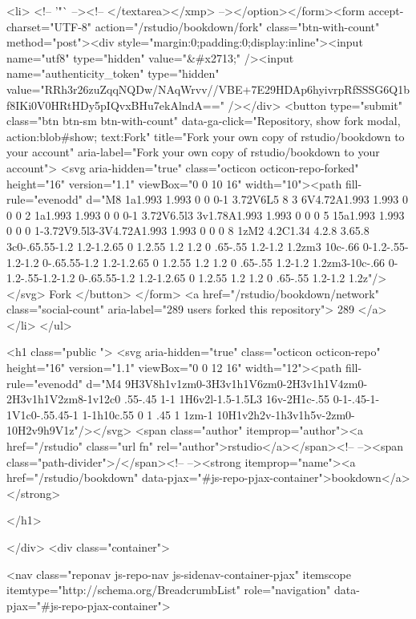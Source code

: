   <li>
          <!-- '"` --><!-- </textarea></xmp> --></option></form><form accept-charset="UTF-8" action="/rstudio/bookdown/fork" class="btn-with-count" method="post"><div style="margin:0;padding:0;display:inline"><input name="utf8" type="hidden" value="&#x2713;" /><input name="authenticity_token" type="hidden" value="RRh3r26zuZqqNQDw/NAqWrvv//VBE+7E29HDAp6hyivrpRfSSSG6Q1bf8IKi0V0HRtHDy5pIQvxBHu7ekAlndA==" /></div>
            <button
                type="submit"
                class="btn btn-sm btn-with-count"
                data-ga-click="Repository, show fork modal, action:blob#show; text:Fork"
                title="Fork your own copy of rstudio/bookdown to your account"
                aria-label="Fork your own copy of rstudio/bookdown to your account">
              <svg aria-hidden="true" class="octicon octicon-repo-forked" height="16" version="1.1" viewBox="0 0 10 16" width="10"><path fill-rule="evenodd" d="M8 1a1.993 1.993 0 0 0-1 3.72V6L5 8 3 6V4.72A1.993 1.993 0 0 0 2 1a1.993 1.993 0 0 0-1 3.72V6.5l3 3v1.78A1.993 1.993 0 0 0 5 15a1.993 1.993 0 0 0 1-3.72V9.5l3-3V4.72A1.993 1.993 0 0 0 8 1zM2 4.2C1.34 4.2.8 3.65.8 3c0-.65.55-1.2 1.2-1.2.65 0 1.2.55 1.2 1.2 0 .65-.55 1.2-1.2 1.2zm3 10c-.66 0-1.2-.55-1.2-1.2 0-.65.55-1.2 1.2-1.2.65 0 1.2.55 1.2 1.2 0 .65-.55 1.2-1.2 1.2zm3-10c-.66 0-1.2-.55-1.2-1.2 0-.65.55-1.2 1.2-1.2.65 0 1.2.55 1.2 1.2 0 .65-.55 1.2-1.2 1.2z"/></svg>
              Fork
            </button>
</form>
    <a href="/rstudio/bookdown/network" class="social-count"
       aria-label="289 users forked this repository">
      289
    </a>
  </li>
</ul>

        <h1 class="public ">
  <svg aria-hidden="true" class="octicon octicon-repo" height="16" version="1.1" viewBox="0 0 12 16" width="12"><path fill-rule="evenodd" d="M4 9H3V8h1v1zm0-3H3v1h1V6zm0-2H3v1h1V4zm0-2H3v1h1V2zm8-1v12c0 .55-.45 1-1 1H6v2l-1.5-1.5L3 16v-2H1c-.55 0-1-.45-1-1V1c0-.55.45-1 1-1h10c.55 0 1 .45 1 1zm-1 10H1v2h2v-1h3v1h5v-2zm0-10H2v9h9V1z"/></svg>
  <span class="author" itemprop="author"><a href="/rstudio" class="url fn" rel="author">rstudio</a></span><!--
--><span class="path-divider">/</span><!--
--><strong itemprop="name"><a href="/rstudio/bookdown" data-pjax="#js-repo-pjax-container">bookdown</a></strong>

</h1>

      </div>
      <div class="container">
        
<nav class="reponav js-repo-nav js-sidenav-container-pjax"
     itemscope
     itemtype="http://schema.org/BreadcrumbList"
     role="navigation"
     data-pjax="#js-repo-pjax-container">

